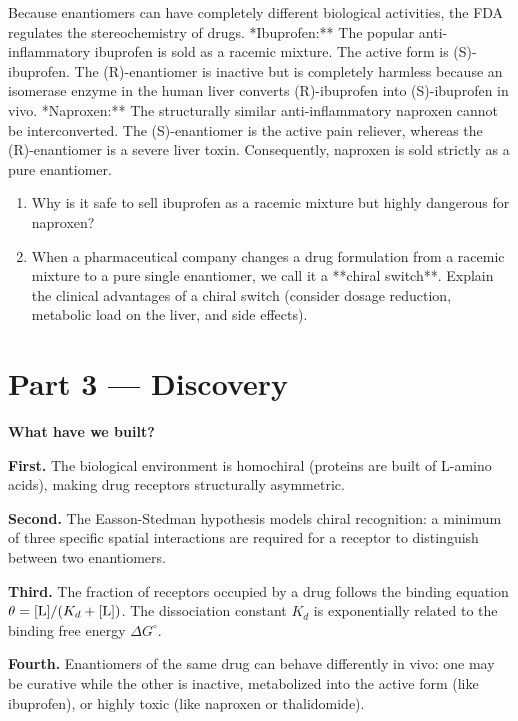 \documentclass[12pt, a4paper]{book}
\begin{document}
\begin{explobox}
Because enantiomers can have completely different biological activities, the FDA regulates the stereochemistry of drugs.
\problem **Ibuprofen:** The popular anti-inflammatory ibuprofen is sold as a racemic mixture. The active form is (S)-ibuprofen. The (R)-enantiomer is inactive but is completely harmless because an isomerase enzyme in the human liver converts (R)-ibuprofen into (S)-ibuprofen in vivo.
\problem **Naproxen:** The structurally similar anti-inflammatory naproxen cannot be interconverted. The (S)-enantiomer is the active pain reliever, whereas the (R)-enantiomer is a severe liver toxin. Consequently, naproxen is sold strictly as a pure enantiomer.
\begin{enumerate}[label=(\alph*), leftmargin=*]
  \item Why is it safe to sell ibuprofen as a racemic mixture but highly dangerous for naproxen?
  \item When a pharmaceutical company changes a drug formulation from a racemic mixture to a pure single enantiomer, we call it a **chiral switch**. Explain the clinical advantages of a chiral switch (consider dosage reduction, metabolic load on the liver, and side effects).
\end{enumerate}
\end{explobox}

\newpage

\section{Part 3 --- Discovery}

\begin{discoverybox}
\textbf{What have we built?}

\textbf{First.} The biological environment is homochiral (proteins are built of L-amino acids), making drug receptors structurally asymmetric.

\textbf{Second.} The Easson-Stedman hypothesis models chiral recognition: a minimum of three specific spatial interactions are required for a receptor to distinguish between two enantiomers.

\textbf{Third.} The fraction of receptors occupied by a drug follows the binding equation $\theta = [\ce{L}]/(K_d + [\ce{L}])$. The dissociation constant $K_d$ is exponentially related to the binding free energy $\Delta G^\circ$.

\textbf{Fourth.} Enantiomers of the same drug can behave differently in vivo: one may be curative while the other is inactive, metabolized into the active form (like ibuprofen), or highly toxic (like naproxen or thalidomide).
\end{discoverybox}
\end{document}
